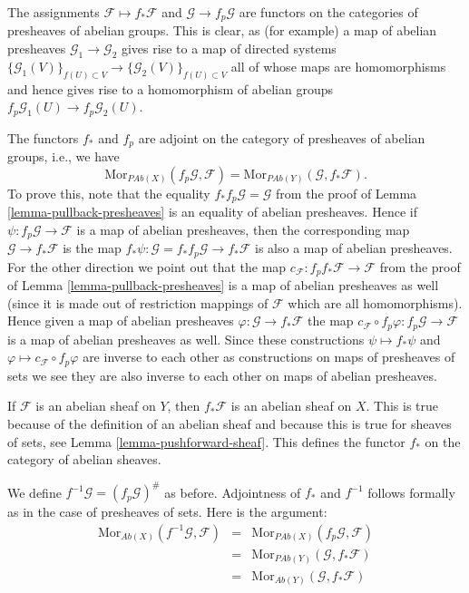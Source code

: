 \medskip\noindent
The assignments $\mathcal{F} \mapsto f_*\mathcal{F}$ and
$\mathcal{G} \to f_p\mathcal{G}$ are functors on
the categories of presheaves of abelian groups.
This is clear, as (for example) a map of abelian presheaves
$\mathcal{G}_1 \to \mathcal{G}_2$ gives rise to a map of
directed systems
$\{\mathcal{G}_1(V)\}_{f(U) \subset V} \to 
\{\mathcal{G}_2(V)\}_{f(U) \subset V}$
all of whose maps are homomorphisms
and hence gives rise to a homomorphism of abelian groups
$f_p\mathcal{G}_1(U) \to f_p\mathcal{G}_2(U)$.

\medskip\noindent
The functors $f_*$ and $f_p$ are adjoint on the
category of presheaves of abelian groups, i.e., we have
$$
\text{Mor}_{\textit{PAb}(X)}(f_p\mathcal{G}, \mathcal{F})
=
\text{Mor}_{\textit{PAb}(Y)}(\mathcal{G}, f_*\mathcal{F}).
$$
To prove this, note that the equality
$f_* f_p\mathcal{G} = \mathcal{G}$ from the proof
of Lemma \ref{lemma-pullback-presheaves}
is an equality of abelian presheaves. Hence if
$\psi : f_p\mathcal{G} \to \mathcal{F}$
is a map of abelian presheaves, then the corresponding map
$\mathcal{G} \to f_*\mathcal{F}$ is the map
$f_*\psi : \mathcal{G} = f_* f_p \mathcal{G} \to f_* \mathcal{F}$
is also a map of abelian presheaves. For the other direction
we point out that the map
$c_{\mathcal{F}} : f_p f_* \mathcal{F} \to \mathcal{F}$
from the proof of Lemma \ref{lemma-pullback-presheaves} is a
map of abelian presheaves as well (since it is made out of restriction
mappings of $\mathcal{F}$ which are all homomorphisms). Hence
given a map of abelian presheaves $\varphi : \mathcal{G} \to f_*\mathcal{F}$
the map
$c_{\mathcal{F}} \circ f_p\varphi : f_p\mathcal{G} \to \mathcal{F}$
is a map of abelian presheaves as well. Since these constructions
$\psi \mapsto f_*\psi$ and $\varphi \mapsto c_{\mathcal{F}} \circ f_p\varphi$
are inverse to each other as constructions on maps of presheaves of sets
we see they are also inverse to each other on maps of abelian presheaves.

\medskip\noindent
If $\mathcal{F}$ is an abelian sheaf on $Y$, then $f_*\mathcal{F}$
is an abelian sheaf on $X$. This is true because of the definition
of an abelian sheaf and because this is true for sheaves of sets,
see Lemma \ref{lemma-pushforward-sheaf}. This defines the functor
$f_*$ on the category of abelian sheaves.

\medskip\noindent
We define $f^{-1}\mathcal{G} = (f_p\mathcal{G})^\#$ as before.
Adjointness of $f_*$ and $f^{-1}$ follows formally as in
the case of presheaves of sets. Here is the argument:
\begin{eqnarray*}
\text{Mor}_{\textit{Ab}(X)}(f^{-1}\mathcal{G}, \mathcal{F})
& = &
\text{Mor}_{\textit{PAb}(X)}(f_p\mathcal{G}, \mathcal{F}) \\
& = &
\text{Mor}_{\textit{PAb}(Y)}(\mathcal{G}, f_*\mathcal{F}) \\
& = &
\text{Mor}_{\textit{Ab}(Y)}(\mathcal{G}, f_*\mathcal{F})
\end{eqnarray*}

